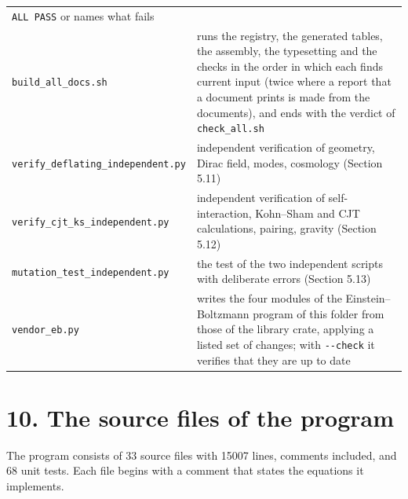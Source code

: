 \documentclass[
  10pt,
]{article}
\begin{document}
\begin{longtable}[]{@{}
  >{\raggedright\arraybackslash}p{}
  >{\raggedright\arraybackslash}p{}@{}}
\texttt{ALL\ PASS} or names what fails \\
\texttt{build\_all\_docs.sh} & runs the registry, the generated tables,
the assembly, the typesetting and the checks in the order in which each
finds current input (twice where a report that a document prints is made
from the documents), and ends with the verdict of
\texttt{check\_all.sh} \\
\texttt{verify\_deflating\_independent.py} & independent verification of
geometry, Dirac field, modes, cosmology (Section 5.11) \\
\texttt{verify\_cjt\_ks\_independent.py} & independent verification of
self-interaction, Kohn--Sham and CJT calculations, pairing, gravity
(Section 5.12) \\
\texttt{mutation\_test\_independent.py} & the test of the two
independent scripts with deliberate errors (Section 5.13) \\
\texttt{vendor\_eb.py} & writes the four modules of the
Einstein--Boltzmann program of this folder from those of the library
crate, applying a listed set of changes; with \texttt{-\/-check} it
verifies that they are up to date \\
\end{longtable}

\hypertarget{the-source-files-of-the-program}{%
\section{10. The source files of the
program}\label{the-source-files-of-the-program}}

The program consists of 33 source files with 15007 lines, comments
included, and 68 unit tests. Each file begins with a comment that states
the equations it implements.
\end{document}
